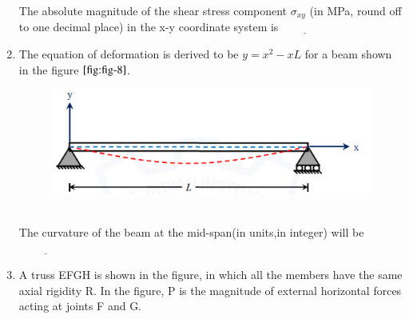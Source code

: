 \documentclass[journal]{IEEEtran}
\numberwithin{equation}{enumi}
\numberwithin{figure}{enumi}
\begin{document}
\begin{enumerate}
The absolute magnitude of the shear stress component $\sigma_{xy}$ (in MPa, round off to one decimal place) in the x-y coordinate system is$\underline{\hspace{2cm}}$
\bigskip
\item The equation of deformation is derived to be $y=x^2 - xL$ for a beam shown in the figure $\ref{fig:fig-8}$.
\begin{figure}[h] %
    \centering
    \includegraphics[width=\textwidth]{figs/fig1.png}
    \caption{}
    \label{fig:fig-8}
\end{figure}
\\The curvature of the beam at the mid-span(in units,in integer) will be $\underline{\hspace{2cm}}$
\bigskip
\item A truss EFGH is shown in the figure, in which all the members have the same axial rigidity R. In the figure, P is the magnitude of external horizontal forces acting at joints F and G.
\end{enumerate}
\end{document}
